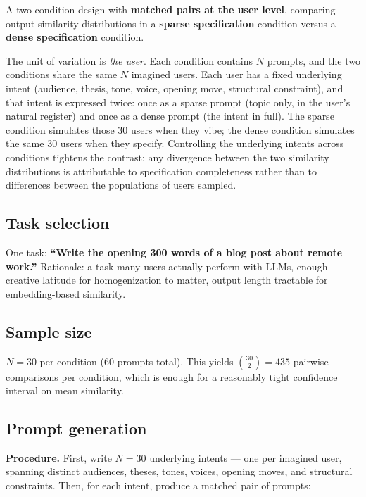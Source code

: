 \documentclass[11pt]{article}
\begin{document}
A two-condition design with \textbf{matched pairs at the user level}, comparing output similarity distributions in a \textbf{sparse specification} condition versus a \textbf{dense specification} condition.

The unit of variation is \emph{the user}. Each condition contains $N$ prompts, and the two conditions share the same $N$ imagined users. Each user has a fixed underlying intent (audience, thesis, tone, voice, opening move, structural constraint), and that intent is expressed twice: once as a sparse prompt (topic only, in the user's natural register) and once as a dense prompt (the intent in full). The sparse condition simulates those 30 users when they vibe; the dense condition simulates the same 30 users when they specify. Controlling the underlying intents across conditions tightens the contrast: any divergence between the two similarity distributions is attributable to specification completeness rather than to differences between the populations of users sampled.

\subsection{Task selection}

One task: \textbf{``Write the opening 300 words of a blog post about remote work.''} Rationale: a task many users actually perform with LLMs, enough creative latitude for homogenization to matter, output length tractable for embedding-based similarity.

\subsection{Sample size}

$N = 30$ per condition (60 prompts total). This yields $\binom{30}{2} = 435$ pairwise comparisons per condition, which is enough for a reasonably tight confidence interval on mean similarity.

\subsection{Prompt generation}

\textbf{Procedure.} First, write $N = 30$ underlying intents --- one per imagined user, spanning distinct audiences, theses, tones, voices, opening moves, and structural constraints. Then, for each intent, produce a matched pair of prompts:
\end{document}
